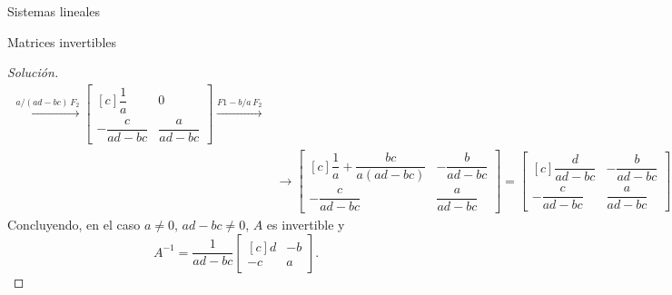 \documentclass[a4paper,12pt,twoside,spanish,reqno]{amsbook}
\theoremstyle{definition}
\theoremstyle{remark}
\begin{document}
\begin{chapter}{Sistemas lineales}
\begin{section}{Matrices invertibles}
\begin{proof}[Solución]
\begin{align*}
				\stackrel{a/(ad-bc)\,F_2}{\longrightarrow}
				\begin{bmatrix*}[c]\dfrac1a&0\\[8pt]-\dfrac{c}{ad-bc}&\dfrac{a}{ad-bc}\end{bmatrix*}
				\stackrel{F1-b/a\,F_2}{\longrightarrow}
				\\&\longrightarrow			
				\begin{bmatrix*}[c]\dfrac1a+\dfrac{bc}{a(ad-bc)}&-\dfrac{b}{ad-bc}\\[8pt]-\dfrac{c}{ad-bc}&\dfrac{a}{ad-bc}\end{bmatrix*} 
				=
				\begin{bmatrix*}[c]\dfrac{d}{ad-bc}&-\dfrac{b}{ad-bc}\\[8pt]-\dfrac{c}{ad-bc}&\dfrac{a}{ad-bc}\end{bmatrix*} .
				\end{align*}  
				Concluyendo, en el caso $a\not=0$, $ad-bc\not=0$, $A$  es invertible y 
				\begin{equation}\label{inv-2x2}
				A^{-1} = \dfrac{1}{ad-bc}
				\begin{bmatrix*}[c]d&-b\\-c&a\end{bmatrix*}.
				\end{equation}
				

\end{proof}
\end{section}
\end{chapter}
\end{document}
